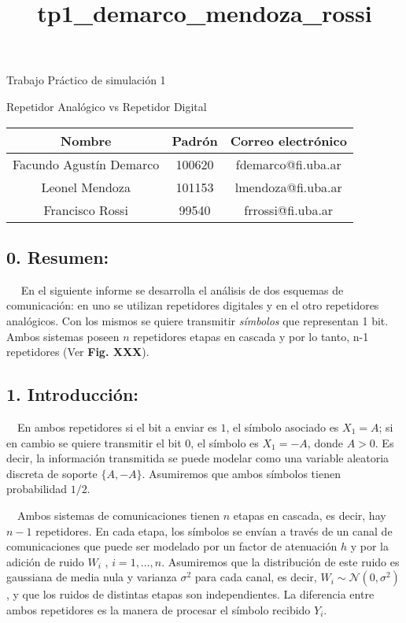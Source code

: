 \documentclass[11pt]{article}
\title{tp1\_demarco\_mendoza\_rossi}
\begin{document}
    
    \maketitle
    
    

    
    Trabajo Práctico de simulación 1

Repetidor Analógico vs Repetidor Digital

\begin{longtable}[]{@{}ccc@{}}
\toprule
Nombre & Padrón & Correo electrónico\tabularnewline
\midrule
\endhead
Facundo Agustín Demarco & 100620 & fdemarco@fi.uba.ar\tabularnewline
Leonel Mendoza & 101153 & lmendoza@fi.uba.ar\tabularnewline
Francisco Rossi & 99540 & frrossi@fi.uba.ar\tabularnewline
\bottomrule
\end{longtable}

\hypertarget{resumen}{%
\subsection{0. Resumen:}\label{resumen}}

\(\quad\) En el siguiente informe se desarrolla el análisis de dos
esquemas de comunicación: en uno se utilizan repetidores digitales y en
el otro repetidores analógicos. Con los mismos se quiere transmitir
\emph{símbolos} que representan 1 bit. Ambos sistemas poseen \(n\)
repetidores etapas en cascada y por lo tanto, n-1 repetidores (Ver
\textbf{Fig. XXX}).

\hypertarget{introducciuxf3n}{%
\subsection{1. Introducción:}\label{introducciuxf3n}}

\(\quad\)En ambos repetidores si el bit a enviar es \(1\), el símbolo
asociado es \(X_1 = A\); si en cambio se quiere transmitir el bit \(0\),
el símbolo es \(X_1 = −A\), donde \(A > 0\). Es decir, la información
transmitida se puede modelar como una variable aleatoria discreta de
soporte \(\{A, −A\}\). Asumiremos que ambos símbolos tienen probabilidad
\(1/2\).

\(\quad\)Ambos sistemas de comunicaciones tienen \(n\) etapas en
cascada, es decir, hay \(n − 1\) repetidores. En cada etapa, los
símbolos se envían a través de un canal de comunicaciones que puede ser
modelado por un factor de atenuación \(h\) y por la adición de ruido
\(W_i\) , \(i = 1, \dots , n\). Asumiremos que la distribución de este
ruido es gaussiana de media nula y varianza \(\sigma^{2}\) para cada
canal, es decir, \(W_i \sim \mathcal{N}(0, \sigma^2)\), y que los ruidos
de distintas etapas son independientes. La diferencia entre ambos
repetidores es la manera de procesar el símbolo recibido \(Y_i\).
\end{document}
